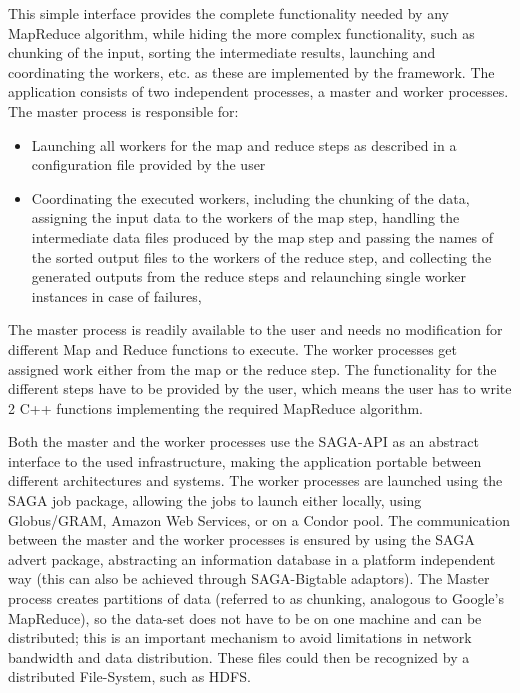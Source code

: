 \documentclass[conference,final]{IEEEtran}
\begin{document}
This simple interface provides the complete functionality needed by
any MapReduce algorithm, while hiding the more complex functionality,
such as chunking of the input, sorting the intermediate results,
launching and coordinating the workers, etc. as these are implemented
by the framework.  The application consists of two independent
processes, a master and worker processes. The master process is
responsible for:

\begin{itemize}
\item Launching all workers for the map and reduce steps as described
  in a configuration file provided by the user 
\item Coordinating the executed workers, including the chunking of the
  data, assigning the input data to the workers of the map step,
  handling the intermediate data files produced by the map step and
  passing the names of the sorted output files to the workers of the
  reduce step, and collecting the generated outputs from the reduce
  steps and relaunching single worker instances in case of failures,
\end{itemize}

The master process is readily available to the user and needs no
modification for different Map and Reduce functions to execute.  The
worker processes get assigned work either from the map or the reduce
step. The functionality for the different steps have to be provided by
the user, which means the user has to write 2 C++ functions
implementing the required MapReduce algorithm.

Both the master and the worker processes use the SAGA-API as an
abstract interface to the used infrastructure, making the application
portable between different architectures and systems. The worker
processes are launched using the SAGA job package, allowing the jobs
to launch either locally, using Globus/GRAM, Amazon Web Services, or
on a Condor pool. The communication between the master and the worker
processes is ensured by using the SAGA advert package, abstracting an
information database in a platform independent way (this can also be
achieved through SAGA-Bigtable adaptors).  The Master process creates
partitions of data (referred to as chunking, analogous to Google's
MapReduce), so the data-set does not have to be on one machine and can
be distributed; this is an important mechanism to avoid limitations in
network bandwidth and data distribution.  These files could then be
recognized by a distributed File-System, such as HDFS. 
\end{document}
